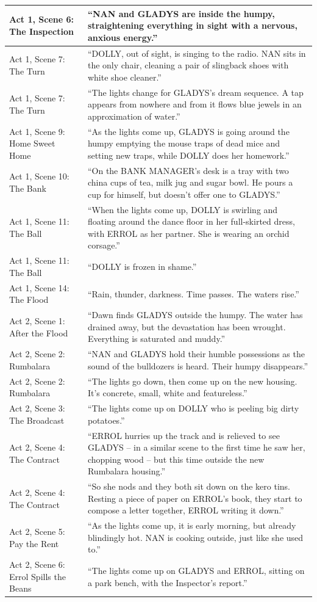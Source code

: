 \documentclass[a4paper]{article}
\begin{document}
\begin{longtable}{|p{3.4cm}|p{9.6cm}|}
\hline
Act 1, Scene 6: The Inspection & ``NAN and GLADYS are inside the humpy, straightening everything in sight with a nervous, anxious energy.'' \\
\hline
Act 1, Scene 7: The Turn & ``DOLLY, out of sight, is singing to the radio. NAN sits in the only chair, cleaning a pair of slingback shoes with white shoe cleaner.'' \\
\hline
Act 1, Scene 7: The Turn & ``The lights change for GLADYS's dream sequence. A tap appears from nowhere and from it flows blue jewels in an approximation of water.'' \\
\hline
Act 1, Scene 9: Home Sweet Home & ``As the lights come up, GLADYS is going around the humpy emptying the mouse traps of dead mice and setting new traps, while DOLLY does her homework.'' \\
\hline
Act 1, Scene 10: The Bank & ``On the BANK MANAGER's desk is a tray with two china cups of tea, milk jug and sugar bowl. He pours a cup for himself, but doesn't offer one to GLADYS.'' \\
\hline
Act 1, Scene 11: The Ball & ``When the lights come up, DOLLY is swirling and floating around the dance floor in her full-skirted dress, with ERROL as her partner. She is wearing an orchid corsage.'' \\
\hline
Act 1, Scene 11: The Ball & ``DOLLY is frozen in shame.'' \\
\hline
Act 1, Scene 14: The Flood & ``Rain, thunder, darkness. Time passes. The waters rise.'' \\
\hline
Act 2, Scene 1: After the Flood & ``Dawn finds GLADYS outside the humpy. The water has drained away, but the devastation has been wrought. Everything is saturated and muddy.'' \\
\hline
Act 2, Scene 2: Rumbalara & ``NAN and GLADYS hold their humble possessions as the sound of the bulldozers is heard. Their humpy disappears.'' \\
\hline
Act 2, Scene 2: Rumbalara & ``The lights go down, then come up on the new housing. It's concrete, small, white and featureless.'' \\
\hline
Act 2, Scene 3: The Broadcast & ``The lights come up on DOLLY who is peeling big dirty potatoes.'' \\
\hline
Act 2, Scene 4: The Contract & ``ERROL hurries up the track and is relieved to see GLADYS -- in a similar scene to the first time he saw her, chopping wood -- but this time outside the new Rumbalara housing.'' \\
\hline
Act 2, Scene 4: The Contract & ``So she nods and they both sit down on the kero tins. Resting a piece of paper on ERROL's book, they start to compose a letter together, ERROL writing it down.'' \\
\hline
Act 2, Scene 5: Pay the Rent & ``As the lights come up, it is early morning, but already blindingly hot. NAN is cooking outside, just like she used to.'' \\
\hline
Act 2, Scene 6: Errol Spills the Beans & ``The lights come up on GLADYS and ERROL, sitting on a park bench, with the Inspector's report.'' \\
\hline
\end{longtable}
\end{document}
